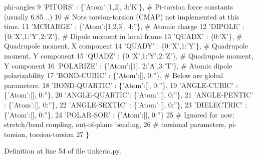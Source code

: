 \begin{DoxyCode}
{       phi-angles}
9          \textcolor{stringliteral}{'PITORS'}       : \{\textcolor{stringliteral}{'Atom'}:[1,2], 3:\textcolor{stringliteral}{'K'}\},           \textcolor{comment}{# Pi-torsion force constants (usually 6.85 ..)}
10          \textcolor{comment}{# Note torsion-torsion (CMAP) not implemented at this time.}
11          \textcolor{stringliteral}{'MCHARGE'}      : \{\textcolor{stringliteral}{'Atom'}:[1,2,3], 4:\textcolor{stringliteral}{''}\},          \textcolor{comment}{# Atomic charge}
12          \textcolor{stringliteral}{'DIPOLE'}       : \{0:\textcolor{stringliteral}{'X'},1:\textcolor{stringliteral}{'Y'},2:\textcolor{stringliteral}{'Z'}\},             \textcolor{comment}{# Dipole moment in local frame}
13          \textcolor{stringliteral}{'QUADX'}        : \{0:\textcolor{stringliteral}{'X'}\},                         \textcolor{comment}{# Quadrupole moment, X component}
14          \textcolor{stringliteral}{'QUADY'}        : \{0:\textcolor{stringliteral}{'X'},1:\textcolor{stringliteral}{'Y'}\},                   \textcolor{comment}{# Quadrupole moment, Y component}
15          \textcolor{stringliteral}{'QUADZ'}        : \{0:\textcolor{stringliteral}{'X'},1:\textcolor{stringliteral}{'Y'},2:\textcolor{stringliteral}{'Z'}\},             \textcolor{comment}{# Quadrupole moment, Y component}
16          \textcolor{stringliteral}{'POLARIZE'}     : \{\textcolor{stringliteral}{'Atom'}:[1], 2:\textcolor{stringliteral}{'A'},3:\textcolor{stringliteral}{'T'}\},       \textcolor{comment}{# Atomic dipole polarizability}
17          \textcolor{stringliteral}{'BOND-CUBIC'}   : \{\textcolor{stringliteral}{'Atom'}:[], 0:\textcolor{stringliteral}{''}\},    \textcolor{comment}{# Below are global parameters.}
18          \textcolor{stringliteral}{'BOND-QUARTIC'} : \{\textcolor{stringliteral}{'Atom'}:[], 0:\textcolor{stringliteral}{''}\},
19          \textcolor{stringliteral}{'ANGLE-CUBIC'}  : \{\textcolor{stringliteral}{'Atom'}:[], 0:\textcolor{stringliteral}{''}\},
20          \textcolor{stringliteral}{'ANGLE-QUARTIC'}: \{\textcolor{stringliteral}{'Atom'}:[], 0:\textcolor{stringliteral}{''}\},
21          \textcolor{stringliteral}{'ANGLE-PENTIC'} : \{\textcolor{stringliteral}{'Atom'}:[], 0:\textcolor{stringliteral}{''}\},
22          \textcolor{stringliteral}{'ANGLE-SEXTIC'} : \{\textcolor{stringliteral}{'Atom'}:[], 0:\textcolor{stringliteral}{''}\},
23          \textcolor{stringliteral}{'DIELECTRIC'}   : \{\textcolor{stringliteral}{'Atom'}:[], 0:\textcolor{stringliteral}{''}\},
24          \textcolor{stringliteral}{'POLAR-SOR'}    : \{\textcolor{stringliteral}{'Atom'}:[], 0:\textcolor{stringliteral}{''}\}
25                                                 \textcolor{comment}{# Ignored for now: stretch/bend coupling, out-of-plane
       bending,}
26                                                 \textcolor{comment}{# torsional parameters, pi-torsion, torsion-torsion}
27          \}
\end{DoxyCode}


Definition at line 54 of file tinkerio.\-py.

